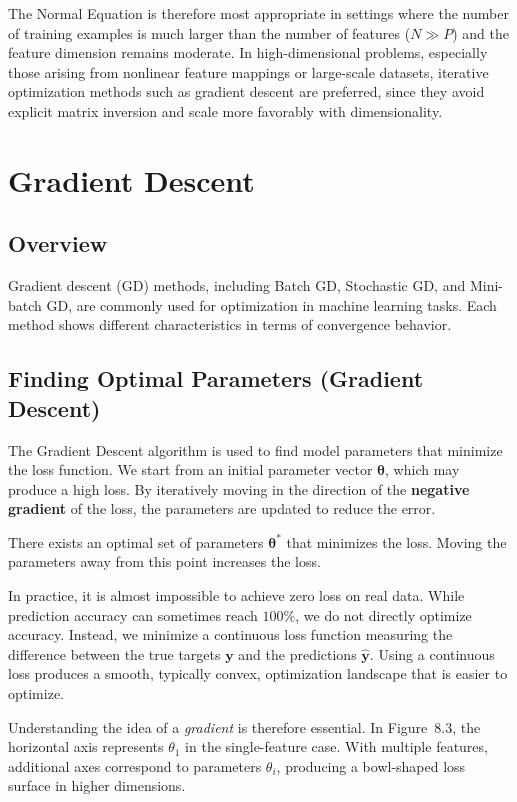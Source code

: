 \documentclass{article}
\begin{document}
The Normal Equation is therefore most appropriate in settings where the number of training examples is much larger than the number of features ($N \gg P$) and the feature dimension remains moderate. In high-dimensional problems, especially those arising from nonlinear feature mappings or large-scale datasets, iterative optimization methods such as gradient descent are preferred, since they avoid explicit matrix inversion and scale more favorably with dimensionality.

\section{Gradient Descent}

\subsection{Overview}
Gradient descent (GD) methods, including Batch GD, Stochastic GD, and Mini-batch GD, are commonly used for optimization in machine learning tasks. Each method shows different characteristics in terms of convergence behavior.

\subsection{Finding Optimal Parameters (Gradient Descent)}

The Gradient Descent algorithm is used to find model parameters that minimize the loss function. We start from an initial parameter vector $\boldsymbol{\theta}$, which may produce a high loss. By iteratively moving in the direction of the \textbf{negative gradient} of the loss, the parameters are updated to reduce the error.

There exists an optimal set of parameters $\boldsymbol{\theta}^\ast$ that minimizes the loss. Moving the parameters away from this point increases the loss.

In practice, it is almost impossible to achieve zero loss on real data. While prediction accuracy can sometimes reach $100\%$, we do not directly optimize accuracy. Instead, we minimize a continuous loss function measuring the difference between the true targets $\mathbf{y}$ and the predictions $\hat{\mathbf{y}}$. Using a continuous loss produces a smooth, typically convex, optimization landscape that is easier to optimize.

Understanding the idea of a \emph{gradient} is therefore essential. In Figure~8.3, the horizontal axis represents $\theta_1$ in the single-feature case. With multiple features, additional axes correspond to parameters $\theta_i$, producing a bowl-shaped loss surface in higher dimensions.
\end{document}
